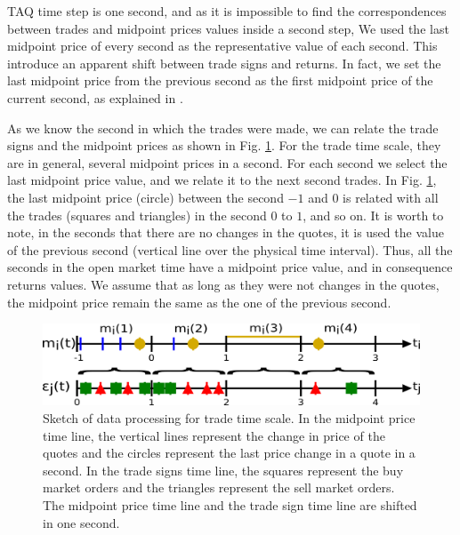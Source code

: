 TAQ time step is one second, and as it is impossible to find the
correspondences between trades and midpoint prices values inside a second step,
We used the last midpoint price of every second as the representative value of
each second. This introduce an apparent shift between trade signs and returns.
In fact, we set the last midpoint price from the previous second as the first
midpoint price of the current second, as explained in \cite{Wang_2016_cross}.

As we know the second in which the trades were made, we can relate the trade
signs and the midpoint prices as shown in Fig.
\ref{fig:relation_trades_midpoint_trade_scale}. For the trade time scale, they
are in general, several midpoint prices in a second. For each second we
select the last midpoint price value, and we relate it to the next second
trades. In Fig. \ref{fig:relation_trades_midpoint_trade_scale}, the last
midpoint price (circle) between the second $-1$ and $0$ is related with all the
trades (squares and triangles) in the second $0$ to $1$, and so on. It is worth
to note, in the seconds that there are no changes in the quotes, it is used the
value of the previous second (vertical line over the physical time interval).
Thus, all the seconds in the open market time have a midpoint price value, and
in consequence returns values. We assume that as long as they were not changes
in the quotes, the midpoint price remain the same as the one of the previous
second.

\begin{figure}[htbp]
    \centering
    \includegraphics[width=\columnwidth]
    {figures/02_relation_trades_quotes_trade_scale.png}
    \caption{Sketch of data processing for trade time scale. In the midpoint
             price time line, the vertical lines represent the change in price
             of the quotes and the circles represent the last price change in a
             quote in a second. In the trade signs time line, the squares
             represent the buy market orders and the triangles represent the
             sell market orders. The midpoint price time line and the trade
             sign time line are shifted in one second.}
    \label{fig:relation_trades_midpoint_trade_scale}
\end{figure}

